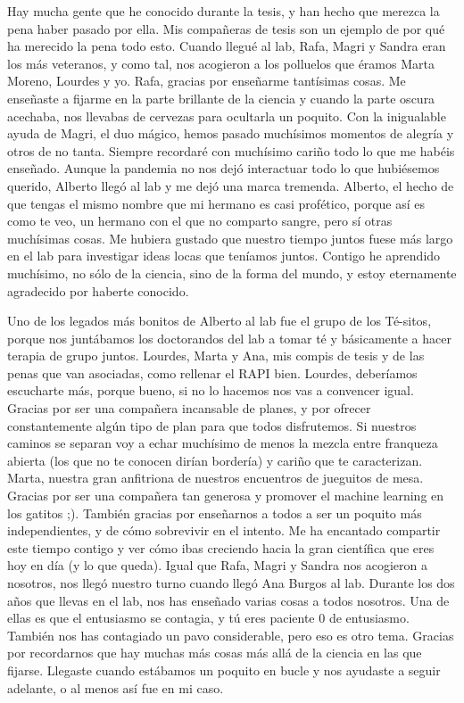 \documentclass[
11pt, %
english, %
singlespacing, %
headsepline, %
chapterinoneline, %
]{MastersDoctoralThesis} %
\begin{document}
\begin{acknowledgements}
Hay mucha gente que he conocido durante la tesis, y han hecho que merezca la pena haber pasado por ella. Mis compañeras de tesis son un ejemplo de por qué ha merecido la pena todo esto. Cuando llegué al lab, Rafa, Magri y Sandra eran los más veteranos, y como tal, nos acogieron a los polluelos que éramos Marta Moreno, Lourdes y yo. Rafa, gracias por enseñarme tantísimas cosas. Me enseñaste a fijarme en la parte brillante de la ciencia y cuando la parte oscura acechaba, nos llevabas de cervezas para ocultarla un poquito. Con la inigualable ayuda de Magri, el duo mágico, hemos pasado muchísimos momentos de alegría y otros de no tanta. Siempre recordaré con muchísimo cariño todo lo que me habéis enseñado. Aunque la pandemia no nos dejó interactuar todo lo que hubiésemos querido, Alberto llegó al lab y me dejó una marca tremenda. Alberto, el hecho de que tengas el mismo nombre que mi hermano es casi profético, porque así es como te veo, un hermano con el que no comparto sangre, pero sí otras muchísimas cosas. Me hubiera gustado que nuestro tiempo juntos fuese más largo en el lab para investigar ideas locas que teníamos juntos. Contigo he aprendido muchísimo, no sólo de la ciencia, sino de la forma del mundo, y estoy eternamente agradecido por haberte conocido. 

Uno de los legados más bonitos de Alberto al lab fue el grupo de los Té-sitos, porque nos juntábamos los doctorandos del lab a tomar té y básicamente a hacer terapia de grupo juntos. Lourdes, Marta y Ana, mis compis de tesis y de las penas que van asociadas, como rellenar el RAPI bien. Lourdes, deberíamos escucharte más, porque bueno, si no lo hacemos nos vas a convencer igual. Gracias por ser una compañera incansable de planes, y por ofrecer constantemente algún tipo de plan para que todos disfrutemos. Si nuestros caminos se separan voy a echar muchísimo de menos la mezcla entre franqueza abierta (los que no te conocen dirían bordería) y cariño que te caracterizan. Marta, nuestra gran anfitriona de nuestros encuentros de jueguitos de mesa. Gracias por ser una compañera tan generosa y promover el machine learning en los gatitos ;). También gracias por enseñarnos a todos a ser un poquito más independientes, y de cómo sobrevivir en el intento. Me ha encantado compartir este tiempo contigo y ver cómo ibas creciendo hacia la gran científica que eres hoy en día (y lo que queda). Igual que Rafa, Magri y Sandra nos acogieron a nosotros, nos llegó nuestro turno cuando llegó Ana Burgos al lab. Durante los dos años que llevas en el lab, nos has enseñado varias cosas a todos nosotros. Una de ellas es que el entusiasmo se contagia, y tú eres paciente 0 de entusiasmo. También nos has contagiado un pavo considerable, pero eso es otro tema. Gracias por recordarnos que hay muchas más cosas más allá de la ciencia en las que fijarse. Llegaste cuando estábamos un poquito en bucle y nos ayudaste a seguir adelante, o al menos así fue en mi caso. 


\end{acknowledgements}
\end{document}
